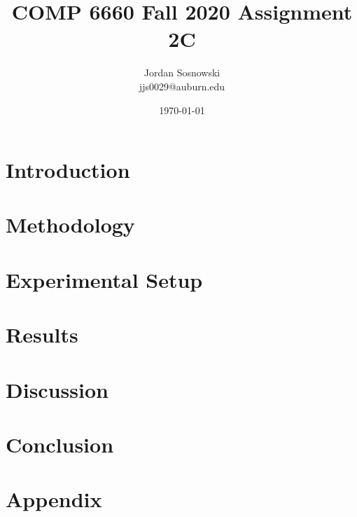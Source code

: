 \documentclass{IEEEtran}
\title{COMP 6660 Fall 2020 Assignment 2C}
\author{Jordan Sosnowski \\
        jjs0029@auburn.edu}
\date{\monthdayyeardate\today}
\begin{document}
\maketitle

\section{Introduction}



\section{Methodology}



\section{Experimental Setup}



\section{Results}



\section{Discussion}



\section{Conclusion}



\section{Appendix}





\end{document}
